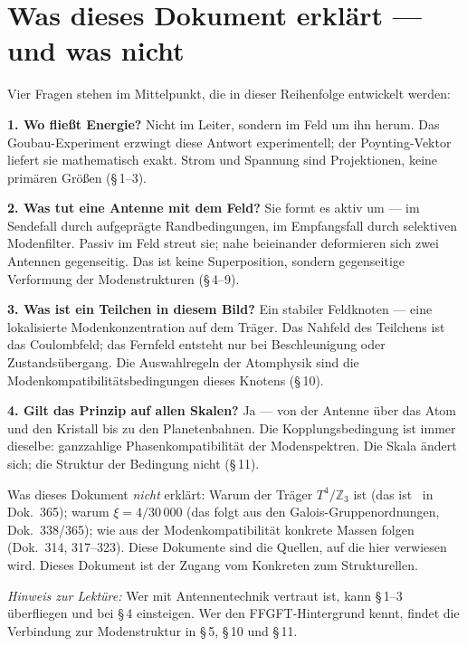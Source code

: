 \section*{Was dieses Dokument erklärt --- und was nicht}

Vier Fragen stehen im Mittelpunkt, die in dieser Reihenfolge entwickelt werden:

\textbf{1. Wo fließt Energie?} Nicht im Leiter, sondern im Feld um ihn herum.
Das Goubau-Experiment erzwingt diese Antwort experimentell; der Poynting-Vektor
liefert sie mathematisch exakt. Strom und Spannung sind Projektionen, keine
primären Größen (§\,1--3).

\textbf{2. Was tut eine Antenne mit dem Feld?} Sie formt es aktiv um ---
im Sendefall durch aufgeprägte Randbedingungen, im Empfangsfall durch
selektiven Modenfilter. Passiv im Feld streut sie; nahe beieinander
deformieren sich zwei Antennen gegenseitig. Das ist keine Superposition,
sondern gegenseitige Verformung der Modenstrukturen (§\,4--9).

\textbf{3. Was ist ein Teilchen in diesem Bild?} Ein stabiler Feldknoten ---
eine lokalisierte Modenkonzentration auf dem Träger. Das Nahfeld des
Teilchens ist das Coulombfeld; das Fernfeld entsteht nur bei Beschleunigung
oder Zustandsübergang. Die Auswahlregeln der Atomphysik sind die
Modenkompatibilitätsbedingungen dieses Knotens (§\,10).

\textbf{4. Gilt das Prinzip auf allen Skalen?} Ja --- von der Antenne über
das Atom und den Kristall bis zu den Planetenbahnen. Die Kopplungsbedingung
ist immer dieselbe: ganzzahlige Phasenkompatibilität der Modenspektren.
Die Skala ändert sich; die Struktur der Bedingung nicht (§\,11).

Was dieses Dokument \emph{nicht} erklärt: Warum der Träger $T^4/\mathbb{Z}_3$
ist (das ist \SetzM\ in Dok.~365); warum $\xi = 4/30\,000$ (das folgt aus
den Galois-Gruppenordnungen, Dok.~338/365); wie aus der Modenkompatibilität
konkrete Massen folgen (Dok.~314, 317--323). Diese Dokumente sind die
Quellen, auf die hier verwiesen wird. Dieses Dokument ist der Zugang vom
Konkreten zum Strukturellen.

\vspace{0.5em}
\noindent
\textit{Hinweis zur Lektüre:} Wer mit Antennentechnik vertraut ist, kann
§\,1--3 überfliegen und bei §\,4 einsteigen. Wer den FFGFT-Hintergrund kennt,
findet die Verbindung zur Modenstruktur in §\,5, §\,10 und §\,11.

